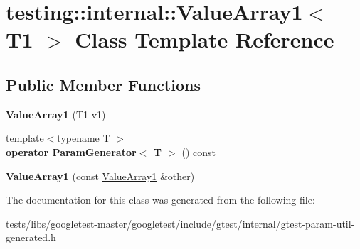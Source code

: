 \hypertarget{classtesting_1_1internal_1_1ValueArray1}{}\section{testing\+:\+:internal\+:\+:Value\+Array1$<$ T1 $>$ Class Template Reference}
\label{classtesting_1_1internal_1_1ValueArray1}
\subsection*{Public Member Functions}
\begin{DoxyCompactItemize}
\item 
\mbox{\label{classtesting_1_1internal_1_1ValueArray1_a8eaffed25a4ddbe790472ca07595a319}} 
{\bfseries Value\+Array1} (T1 v1)
\item 
\mbox{\label{classtesting_1_1internal_1_1ValueArray1_a1ffe0a28fd09efa980df1aaa3f7af2a0}} 
{\footnotesize template$<$typename T $>$ }\\{\bfseries operator Param\+Generator$<$ T $>$} () const
\item 
\mbox{\label{classtesting_1_1internal_1_1ValueArray1_a54a3968da3354334cb4d730f5254e216}} 
{\bfseries Value\+Array1} (const \hyperlink{classtesting_1_1internal_1_1ValueArray1}{Value\+Array1} \&other)
\end{DoxyCompactItemize}


The documentation for this class was generated from the following file\+:\begin{DoxyCompactItemize}
\item 
tests/libs/googletest-\/master/googletest/include/gtest/internal/gtest-\/param-\/util-\/generated.\+h\end{DoxyCompactItemize}
